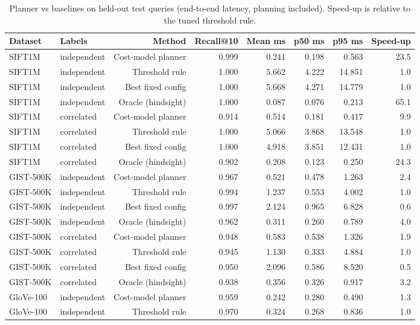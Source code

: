 \begin{table}[t]
\centering\small
\caption{Planner vs baselines on held-out test queries (end-to-end latency, planning included). Speed-up is relative to the tuned threshold rule.}
\label{tab:planner_results}
\begin{tabular}{llrrrrrr}
\toprule
Dataset & Labels & Method & Recall@10 & Mean ms & p50 ms & p95 ms & Speed-up \\
\midrule
SIFT1M & independent & Cost-model planner & 0.999 & 0.241 & 0.198 & 0.563 & 23.5 \\
SIFT1M & independent & Threshold rule & 1.000 & 5.662 & 4.222 & 14.851 & 1.0 \\
SIFT1M & independent & Best fixed config & 1.000 & 5.668 & 4.271 & 14.779 & 1.0 \\
SIFT1M & independent & Oracle (hindsight) & 1.000 & 0.087 & 0.076 & 0.213 & 65.1 \\
SIFT1M & correlated & Cost-model planner & 0.914 & 0.514 & 0.181 & 0.417 & 9.9 \\
SIFT1M & correlated & Threshold rule & 1.000 & 5.066 & 3.868 & 13.548 & 1.0 \\
SIFT1M & correlated & Best fixed config & 1.000 & 4.918 & 3.851 & 12.431 & 1.0 \\
SIFT1M & correlated & Oracle (hindsight) & 0.902 & 0.208 & 0.123 & 0.250 & 24.3 \\
GIST-500K & independent & Cost-model planner & 0.967 & 0.521 & 0.478 & 1.263 & 2.4 \\
GIST-500K & independent & Threshold rule & 0.994 & 1.237 & 0.553 & 4.002 & 1.0 \\
GIST-500K & independent & Best fixed config & 0.997 & 2.124 & 0.965 & 6.828 & 0.6 \\
GIST-500K & independent & Oracle (hindsight) & 0.962 & 0.311 & 0.260 & 0.789 & 4.0 \\
GIST-500K & correlated & Cost-model planner & 0.948 & 0.583 & 0.538 & 1.326 & 1.9 \\
GIST-500K & correlated & Threshold rule & 0.945 & 1.130 & 0.333 & 4.884 & 1.0 \\
GIST-500K & correlated & Best fixed config & 0.950 & 2.096 & 0.586 & 8.520 & 0.5 \\
GIST-500K & correlated & Oracle (hindsight) & 0.938 & 0.356 & 0.326 & 0.917 & 3.2 \\
GloVe-100 & independent & Cost-model planner & 0.959 & 0.242 & 0.280 & 0.490 & 1.3 \\
GloVe-100 & independent & Threshold rule & 0.970 & 0.324 & 0.268 & 0.836 & 1.0 \\

\end{tabular}
\end{table}
